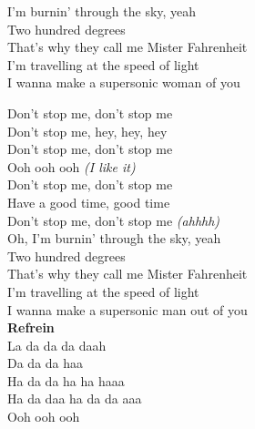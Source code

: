 I'm burnin' through the sky, yeah\\
Two hundred degrees\\
That's why they call me Mister Fahrenheit\\
I'm travelling at the speed of light\\
I wanna make a supersonic woman of you

Don't stop me, don't stop me\\
Don't stop me, hey, hey, hey\\
Don't stop me, don't stop me\\
Ooh ooh ooh \textit{(I like it)}\\
Don't stop me, don't stop me\\
Have a good time, good time\\
Don't stop me, don't stop me \textit{(ahhhh)}\\

Oh, I'm burnin' through the sky, yeah\\
Two hundred degrees\\
That's why they call me Mister Fahrenheit\\
I'm travelling at the speed of light\\
I wanna make a supersonic man out of you\\

\textbf{Refrein}\\

La da da da daah\\
Da da da haa\\
Ha da da ha ha haaa\\
Ha da daa ha da da aaa\\
Ooh ooh ooh\\
